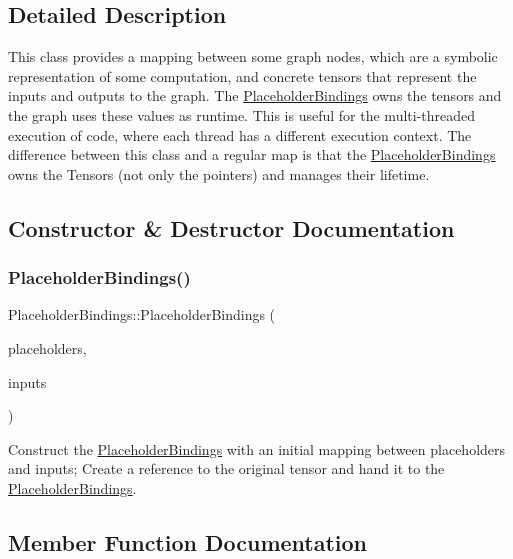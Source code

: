 \subsection{Detailed Description}
This class provides a mapping between some graph nodes, which are a symbolic representation of some computation, and concrete tensors that represent the inputs and outputs to the graph. The \hyperlink{classglow_1_1_placeholder_bindings}{Placeholder\+Bindings} owns the tensors and the graph uses these values as runtime. This is useful for the multi-\/threaded execution of code, where each thread has a different execution context. The difference between this class and a regular map is that the \hyperlink{classglow_1_1_placeholder_bindings}{Placeholder\+Bindings} owns the Tensors (not only the pointers) and manages their lifetime. 

\subsection{Constructor \& Destructor Documentation}
\mbox{\label{classglow_1_1_placeholder_bindings_a9d3fc7d15e95e583d24f8b1a66aff54f}} 
\subsubsection{\texorpdfstring{Placeholder\+Bindings()}{PlaceholderBindings()}}
{\footnotesize\ttfamily Placeholder\+Bindings\+::\+Placeholder\+Bindings (\begin{DoxyParamCaption}\item[{llvm\+::\+Array\+Ref$<$ \hyperlink{classglow_1_1_placeholder}{Placeholder} $\ast$$>$}]{placeholders,  }\item[{llvm\+::\+Array\+Ref$<$ \hyperlink{classglow_1_1_tensor}{Tensor} $\ast$$>$}]{inputs }\end{DoxyParamCaption})}

Construct the \hyperlink{classglow_1_1_placeholder_bindings}{Placeholder\+Bindings} with an initial mapping between {\ttfamily placeholders} and {\ttfamily inputs}; Create a reference to the original tensor and hand it to the \hyperlink{classglow_1_1_placeholder_bindings}{Placeholder\+Bindings}. 

\subsection{Member Function Documentation}
\mbox{\label{classglow_1_1_placeholder_bindings_a25e8442dbf233cf922f866e4802c8d70}} 
